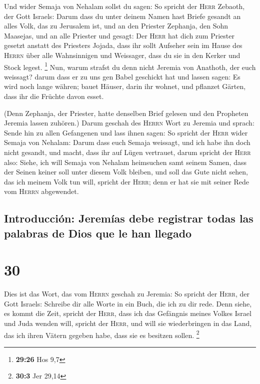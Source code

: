  Und wider Semaja von Nehalam sollst du sagen:
 So spricht der \textsc{Herr} Zebaoth, der Gott Israels:
Darum dass du unter deinem Namen hast Briefe gesandt an alles Volk, das
zu Jerusalem ist, und an den Priester Zephanja, den Sohn Maasejas, und
an alle Priester und gesagt:  Der \textsc{Herr} hat dich
zum Priester gesetzt anstatt des Priesters Jojada, dass ihr sollt
Aufseher sein im Hause des \textsc{Herrn} über alle Wahnsinnigen und
Weissager, dass du sie in den Kerker und Stock legest. \footnote{\textbf{29:26}
  Hos 9,7}  Nun, warum strafst du denn nicht Jeremia von
Anathoth, der euch weissagt?  darum dass er zu uns gen
Babel geschickt hat und lassen sagen: Es wird noch lange währen; bauet
Häuser, darin ihr wohnet, und pflanzet Gärten, dass ihr die Früchte
davon esset.

 (Denn Zephanja, der Priester, hatte denselben Brief
gelesen und den Propheten Jeremia lassen zuhören.)  Darum
geschah des \textsc{Herrn} Wort zu Jeremia und sprach: 
Sende hin zu allen Gefangenen und lass ihnen sagen: So spricht der
\textsc{Herr} wider Semaja von Nehalam: Darum dass euch Semaja weissagt,
und ich habe ihn doch nicht gesandt, und macht, dass ihr auf Lügen
vertrauet,  darum spricht der \textsc{Herr} also: Siehe,
ich will Semaja von Nehalam heimsuchen samt seinem Samen, dass der
Seinen keiner soll unter diesem Volk bleiben, und soll das Gute nicht
sehen, das ich meinem Volk tun will, spricht der \textsc{Herr}; denn er
hat sie mit seiner Rede vom \textsc{Herrn} abgewendet.

\hypertarget{introducciuxf3n-jeremuxedas-debe-registrar-todas-las-palabras-de-dios-que-le-han-llegado}{%
\subsection{Introducción: Jeremías debe registrar todas las palabras de
Dios que le han
llegado}\label{introducciuxf3n-jeremuxedas-debe-registrar-todas-las-palabras-de-dios-que-le-han-llegado}}

\hypertarget{section-29}{%
\section{30}\label{section-29}}

 Dies ist das Wort, das vom \textsc{Herrn} geschah zu
Jeremia:  So spricht der \textsc{Herr}, der Gott Israels:
Schreibe dir alle Worte in ein Buch, die ich zu dir rede. 
Denn siehe, es kommt die Zeit, spricht der \textsc{Herr}, dass ich das
Gefängnis meines Volkes Israel und Juda wenden will, spricht der
\textsc{Herr}, und will sie wiederbringen in das Land, das ich ihren
Vätern gegeben habe, dass sie es besitzen sollen. \footnote{\textbf{30:3}
  Jer 29,14}

